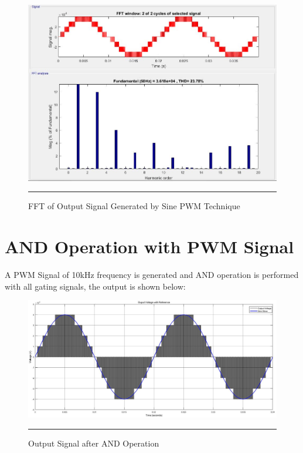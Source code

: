\begin{figure}[htbp]
	\centering
	\includegraphics[width = 6in]{./Figures/Photos/Simulink/SPWM_Out_FFT.jpg}
	\rule{35em}{1pt}
	\caption{FFT of Output Signal Generated by Sine PWM Technique}
\end{figure}

\section{AND Operation with PWM Signal}
A PWM Signal of 10kHz frequency is generated and AND operation is performed with all gating signals, the output is shown below:
\begin{figure}[htbp]
	\centering
	\includegraphics[width = 6in]{./Figures/Photos/Simulink/And_PWM_Out.jpg}
	\rule{35em}{1pt}
	\caption{Output Signal after AND Operation}
\end{figure}

